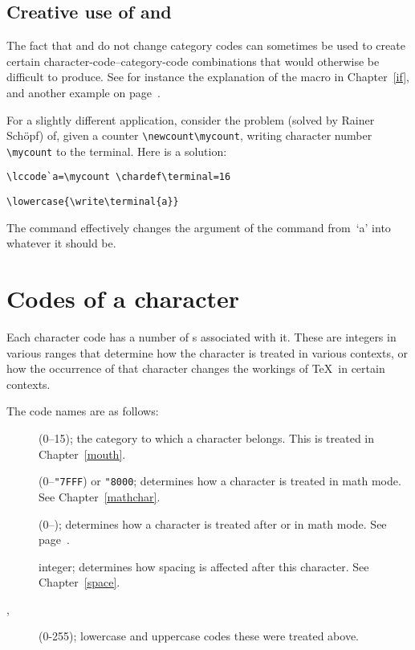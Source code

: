 \subsection{Creative use of  and }

The fact that  and  do not change
category codes can sometimes be used to create certain
character-code--category-code combinations that would
otherwise be difficult to produce. See for instance the
explanation of the  macro in Chapter~\ref{if},
and another example on page~\pageref{spsb:truc}.

For a slightly different application, consider the
problem (solved by Rainer Sch\"opf) of,
given a counter \verb-\newcount\mycount-, writing character
number \verb-\mycount- to the terminal.
Here is a solution:
\begin{verbatim}
\lccode`a=\mycount \chardef\terminal=16
\end{verbatim}
\begin{verbatim}
\lowercase{\write\terminal{a}}
\end{verbatim}
The  command effectively changes the 
argument of the  command from~`\n a'
into whatever it should be.

\section{Codes of a character}
\label{codename}

Each character code has a number of s 
associated
with it. These are integers in various ranges that determine
how the character is treated in various contexts, or
how the occurrence of that character changes the workings
of \TeX\ in certain contexts.

The code names are as follows:
\begin{description}\item []
 (0--15); the category to which a character belongs.
This is treated in Chapter~\ref{mouth}.
\item []
 (0--\verb-"7FFF-) or \verb-"8000-;
determines how a character is treated
in math mode. See Chapter~\ref{mathchar}.
\item []
 (0--);
determines how a character is treated after
 or  in math mode.
See page~\pageref{delcodes}.
\item []
integer; determines how spacing is affected after this character.
See Chapter~\ref{space}.
\item [, ]
 (0-255); lowercase and
uppercase codes \rdash these were treated above.
\end{description}

